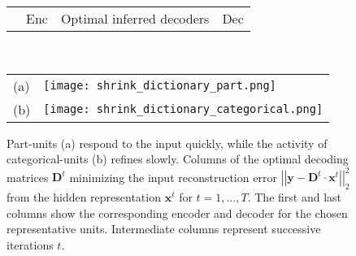 \documentclass{article} %
\newcommand{\x}{\mathbf{x}}
\newcommand{\y}{\mathbf{y}}
\newcommand{\D}{\mathbf{D}}
\begin{document}
\begin{comment}
    \begin{tabular}{p{0.02in}p{0.1in}p{1.85in}p{0.3in}p{0.1in}p{1.85in}p{0.5in}} & Enc & Optimal inferred decoders & Dec & Enc & Optimal inferred decoders & Dec \end{tabular} \\
    \begin{tabular}{p{0.02in}p{2.4in}p{0.02in}p{2.4in}}
      \parbox[b]{0in}{(a) \vspace{0.7cm}} & \texttt{[image: shrink\_dictionary\_part.png]} &
      \parbox[b]{0in}{(b) \vspace{0.7cm}} & \texttt{[image: shrink\_dictionary\_categorical.png]} 
    \end{tabular}
\end{comment}

\begin{figure}[tb] %
  \begin{center}
    \begin{tabular}{p{0.12in}p{0.35in}p{4.05in}p{1in}} & Enc & Optimal inferred decoders & Dec \end{tabular} \\
    \begin{tabular}{p{0.03in}p{5.0in}}
      \parbox[b]{0in}{(a) \vspace{2.1cm}} & \texttt{[image: shrink\_dictionary\_part.png]} \\
      \parbox[b]{0in}{(b) \vspace{2.1cm}} & \texttt{[image: shrink\_dictionary\_categorical.png]} 
    \end{tabular}
  \end{center}
  \caption{Part-units (a) respond to the input quickly, while the activity of categorical-units (b) refines slowly.  Columns of the optimal decoding matrices $\D^t$ minimizing the input reconstruction error $\left|\left| \y - \D^t \cdot \x^t \right|\right|_2^2$ from the hidden representation $\x^t$ for $t = 1, \ldots, T$.  The first and last columns show the corresponding encoder and decoder for the chosen representative units.  Intermediate columns represent successive iterations $t$.  \label{dictionary_evolution_figure}} %
\end{figure}
\end{document}
